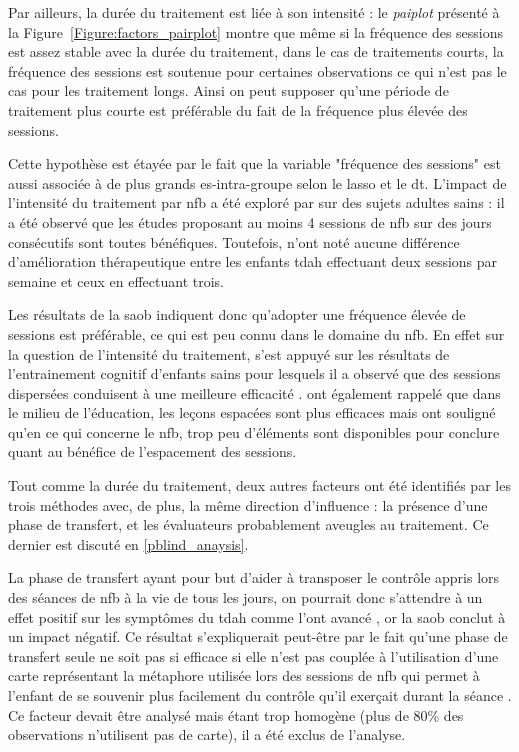 Par ailleurs, la durée du traitement est liée à son intensité : le \textit{paiplot} présenté à la Figure~\ref{Figure:factors_pairplot} montre que même si
la fréquence des sessions est assez stable avec la durée du traitement, dans le cas de traitements courts, la fréquence
des sessions est soutenue pour certaines observations ce qui n'est pas le cas pour les traitement longs. Ainsi on peut 
supposer qu'une période de traitement plus courte est préférable du fait de la fréquence plus élevée des sessions. 

Cette hypothèse est étayée par le fait que la variable "fréquence des sessions" est aussi associée à de plus grands \gls{es}-intra-groupe selon le
\gls{lasso} et le \gls{dt}. L'impact de l'intensité du traitement par \gls{nfb} a été exploré par \citet{Rogala2016} sur des sujets adultes sains : il a été
observé que les études proposant au moins 4 sessions de \gls{nfb} sur des jours consécutifs sont toutes bénéfiques. Toutefois,
\citet{Arnold2014} n'ont noté aucune différence d'amélioration thérapeutique entre les enfants \gls{tdah} effectuant deux sessions par semaine
et ceux en effectuant trois. 

Les résultats de la \gls{saob} indiquent donc qu'adopter une fréquence élevée de sessions est préférable, ce qui est peu connu dans le domaine du \gls{nfb}. 
En effet sur la question de l'intensité du traitement, \citet{Strehl2014} s'est appuyé sur les résultats de l'entrainement cognitif d'enfants 
sains pour lesquels il a observé que des sessions dispersées conduisent à une meilleure efficacité \citep{Wang2014}. \citet{Enriquez2017} ont
également rappelé que dans le milieu de l'éducation, les leçons espacées sont plus efficaces mais ont souligné qu'en ce qui concerne le \gls{nfb},
trop peu d'éléments sont disponibles pour conclure quant au bénéfice de l'espacement des sessions.

Tout comme la durée du traitement, deux autres facteurs ont été identifiés par les trois méthodes avec, de plus, la même direction d'influence : la présence d'une phase de transfert, 
et les évaluateurs probablement aveugles au traitement. Ce dernier est discuté en \ref{pblind_anaysis}.

La phase de transfert ayant pour but d'aider à transposer le contrôle appris lors des séances de \gls{nfb} à la vie de tous les jours, on pourrait donc s'attendre à un effet positif sur les symptômes
du \gls{tdah} comme l'ont avancé \citet{Arns2014, Strehl2006, Gani2008}, or la \gls{saob} conclut à un impact négatif. Ce résultat s'expliquerait peut-être par le fait qu'une phase de 
transfert seule ne soit pas si efficace si elle n'est pas couplée à l'utilisation d'une carte représentant la métaphore utilisée lors des sessions de \gls{nfb} qui permet à l'enfant de se 
souvenir plus facilement du contrôle qu'il exerçait durant la séance \citep{Bioulac2019, Bluschke2016}. Ce facteur devait être analysé mais étant trop homogène (plus de 80\% des observations 
n'utilisent pas de carte), il a été exclus de l'analyse. 

